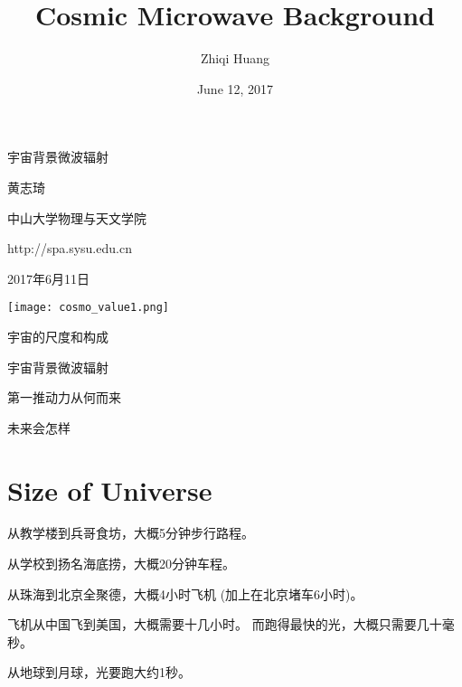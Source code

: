\documentclass[CJK]{beamer}
\title{Cosmic Microwave Background}
\author{Zhiqi Huang}
\institute{Sun Yat-sen University}
\date{June 12, 2017}
\begin{document}
\begin{frame}
  \bch
  \bcenter
      {\Huge 宇宙背景微波辐射}

      
      {\Large 黄志琦}

      \skipline
      
      中山大学物理与天文学院

      {\scriptsize http://spa.sysu.edu.cn}

      \skiplines
      
      {2017年6月11日}
      \ecenter
      \ech
\end{frame}


\begin{frame}
\centering
\texttt{[image: cosmo\_value1.png]}
\end{frame}


\begin{frame}
\centering
\bch
\bitem
\item{宇宙的尺度和构成}
\item{宇宙背景微波辐射}
\item{第一推动力从何而来}
\item{未来会怎样}
  \eitem
  \ech
\end{frame}

\section{Size of Universe}
\begin{frame}
  \bch
  \bitem
\item{从教学楼到兵哥食坊，大概5分钟步行路程。}
\item{从学校到扬名海底捞，大概20分钟车程。}
\item{从珠海到北京全聚德，大概4小时飞机 (加上在北京堵车6小时)。}
  \eitem

  
  \ech
\end{frame}

\begin{frame}
  \bch
  飞机从中国飞到美国，大概需要十几小时。
  而跑得最快的光，大概只需要几十毫秒。
  \ech
\end{frame}


\begin{frame}
  \bch

 \bcenter 
  从地球到月球，光要跑大约1秒。
  \ecenter
  \ech
\end{frame}
\end{document}
